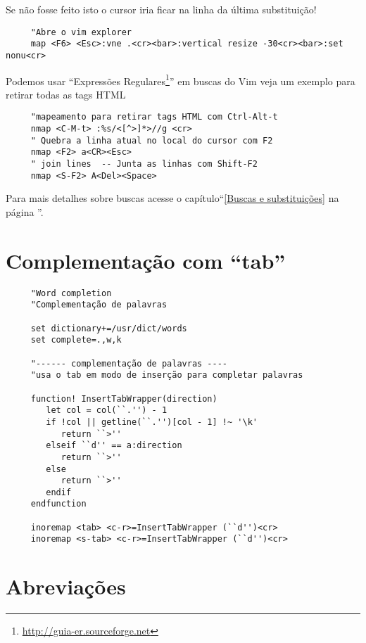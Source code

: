 Se não fosse feito isto o cursor iria ficar na linha da última substituição!

\begin{verbatim}
     "Abre o vim explorer
     map <F6> <Esc>:vne .<cr><bar>:vertical resize -30<cr><bar>:set nonu<cr>
\end{verbatim}

Podemos usar ``Expressões Regulares\footnote{\url{http://guia-er.sourceforge.net}}'' em
buscas do Vim veja um exemplo para retirar todas as tags HTML

\begin{verbatim}
     "mapeamento para retirar tags HTML com Ctrl-Alt-t
     nmap <C-M-t> :%s/<[^>]*>//g <cr>
     " Quebra a linha atual no local do cursor com F2
     nmap <F2> a<CR><Esc>
     " join lines  -- Junta as linhas com Shift-F2
     nmap <S-F2> A<Del><Space>
\end{verbatim}

Para mais detalhes sobre buscas acesse o capítulo``\ref{Buscas e substituições}
na página \pageref{Buscas e substituições}''.

\section{Complementação com ``tab''}\label{Complementação com ``tab''}

\begin{verbatim}
     "Word completion
     "Complementação de palavras
     
     set dictionary+=/usr/dict/words
     set complete=.,w,k
     
     "------ complementação de palavras ----
     "usa o tab em modo de inserção para completar palavras
     
     function! InsertTabWrapper(direction)
        let col = col(``.'') - 1
        if !col || getline(``.'')[col - 1] !~ '\k'
           return ``>''
        elseif ``d'' == a:direction
           return ``>''
        else
           return ``>''
        endif
     endfunction
     
     inoremap <tab> <c-r>=InsertTabWrapper (``d'')<cr>
     inoremap <s-tab> <c-r>=InsertTabWrapper (``d'')<cr>
\end{verbatim}

\section{Abreviações}\label{Abreviações}


